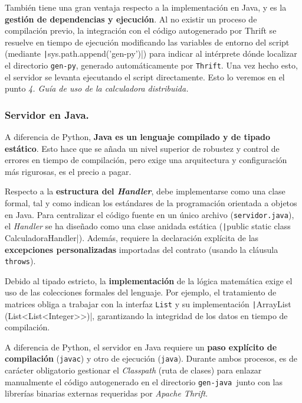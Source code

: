 \documentclass[a4paper,12pt]{article}
\begin{document}
				También tiene una gran ventaja respecto a la implementación en Java, y es la \textbf{gestión de dependencias y ejecución}. Al no existir un proceso de compilación previo, la integración con el código autogenerado por Thrift se resuelve en tiempo de ejecución modificando las variables de entorno del script (mediante \texttt|sys.path.append('gen-py')|) para indicar al intérprete dónde localizar el directorio \texttt{gen-py}, generado automáticamente por \texttt{Thrift}. Una vez hecho esto, el servidor se levanta ejecutando el script directamente. Esto lo veremos en el punto \textit{4. Guía de uso de la calculadora distribuida.}
			
			\subsubsection{Servidor en Java.}
				A diferencia de Python, \textbf{Java es un lenguaje compilado y de tipado estático}. Esto hace que se añada un nivel superior de robustez y control de errores en tiempo de compilación, pero exige una arquitectura y configuración más rigurosas, es el precio a pagar.
				
				Respecto a la \textbf{estructura del \textit{Handler}}, debe implementarse como una clase formal, tal y como indican los estándares de la programación orientada a objetos en Java. Para centralizar el código fuente en un único archivo (\texttt{servidor.java}), el \textit{Handler} se ha diseñado como una clase anidada estática (\texttt|public static class CalculadoraHandler|). Además, requiere la declaración explícita de las \textbf{excepciones personalizadas} importadas del contrato (usando la cláusula \texttt{throws}).
				
				Debido al tipado estricto, la \textbf{implementación} de la lógica matemática exige el uso de las colecciones formales del lenguaje. Por ejemplo, el tratamiento de matrices obliga a trabajar con la interfaz \texttt{List} y su implementación \texttt|ArrayList (List<List<Integer>>)|, garantizando la integridad de los datos en tiempo de compilación.
				
				A diferencia de Python, el servidor en Java requiere un \textbf{paso explícito de compilación} (\texttt{javac}) y otro de ejecución (\texttt{java}). Durante ambos procesos, es de carácter obligatorio gestionar el \textit{Classpath} (ruta de clases) para enlazar manualmente el código autogenerado en el directorio \texttt{gen-java }junto con las librerías binarias externas requeridas por \textit{Apache Thrift}.
		
\end{document}
